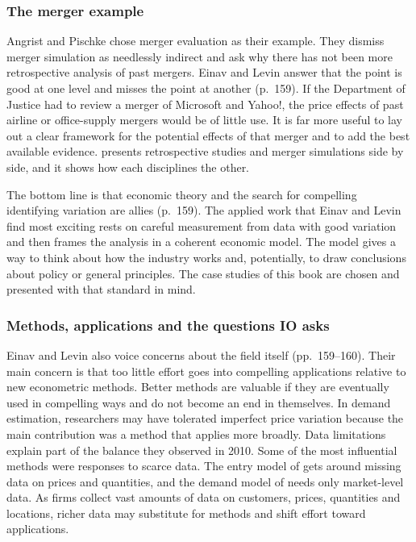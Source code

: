 \subsubsection{The merger example}

Angrist and Pischke chose merger evaluation as their example. They dismiss merger simulation as needlessly
indirect and ask why there has not been more retrospective analysis of past mergers. Einav and Levin answer
that the point is good at one level and misses the point at another (p.~159). If the Department of Justice had
to review a merger of Microsoft and Yahoo!, the price effects of past airline or office-supply mergers would be
of little use. It is far more useful to lay out a clear framework for the potential effects of that merger and
to add the best available evidence.  presents retrospective studies and merger simulations
side by side, and it shows how each disciplines the other.

The bottom line is that economic theory and the search for compelling identifying variation are allies
(p.~159). The applied work that Einav and Levin find most exciting rests on careful measurement from data with
good variation and then frames the analysis in a coherent economic model. The model gives a way to think about
how the industry works and, potentially, to draw conclusions about policy or general principles. The case
studies of this book are chosen and presented with that standard in mind.

\subsubsection{Methods, applications and the questions IO asks}

Einav and Levin also voice concerns about the field itself (pp.~159--160). Their main concern is that too
little effort goes into compelling applications relative to new econometric methods. Better methods are
valuable if they are eventually used in compelling ways and do not become an end in themselves. In demand
estimation, researchers may have tolerated imperfect price variation because the main contribution was a
method that applies more broadly. Data limitations explain part of the balance they observed in 2010. Some of the most
influential methods were responses to scarce data. The entry model of \citet{BresnahanReiss1991} gets around
missing data on prices and quantities, and the demand model of \citet{BerryLevinsohnPakes1995} needs only
market-level data. As firms collect vast amounts of data on customers, prices, quantities and locations,
richer data may substitute for methods and shift effort toward applications.

